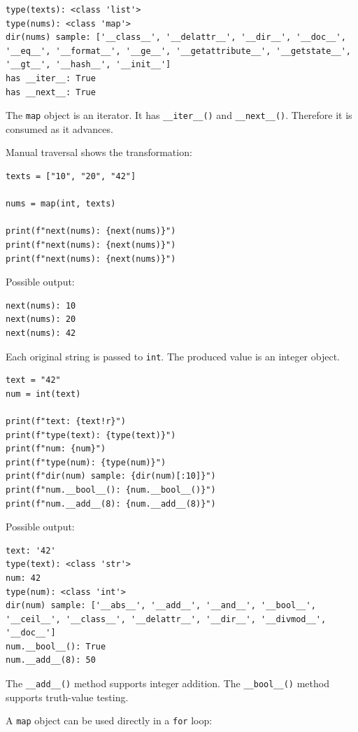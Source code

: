 \begin{verbatim}
type(texts): <class 'list'>
type(nums): <class 'map'>
dir(nums) sample: ['__class__', '__delattr__', '__dir__', '__doc__',
'__eq__', '__format__', '__ge__', '__getattribute__', '__getstate__',
'__gt__', '__hash__', '__init__']
has __iter__: True
has __next__: True
\end{verbatim}

The \texttt{map} object is an iterator. It has \texttt{\_\_iter\_\_()} and \texttt{\_\_next\_\_()}. Therefore it is consumed as it advances.

Manual traversal shows the transformation:

\begin{verbatim}
texts = ["10", "20", "42"]

nums = map(int, texts)

print(f"next(nums): {next(nums)}")
print(f"next(nums): {next(nums)}")
print(f"next(nums): {next(nums)}")
\end{verbatim}

Possible output:

\begin{verbatim}
next(nums): 10
next(nums): 20
next(nums): 42
\end{verbatim}

Each original string is passed to \texttt{int}. The produced value is an integer object.

\begin{verbatim}
text = "42"
num = int(text)

print(f"text: {text!r}")
print(f"type(text): {type(text)}")
print(f"num: {num}")
print(f"type(num): {type(num)}")
print(f"dir(num) sample: {dir(num)[:10]}")
print(f"num.__bool__(): {num.__bool__()}")
print(f"num.__add__(8): {num.__add__(8)}")
\end{verbatim}

Possible output:

\begin{verbatim}
text: '42'
type(text): <class 'str'>
num: 42
type(num): <class 'int'>
dir(num) sample: ['__abs__', '__add__', '__and__', '__bool__',
'__ceil__', '__class__', '__delattr__', '__dir__', '__divmod__',
'__doc__']
num.__bool__(): True
num.__add__(8): 50
\end{verbatim}

The \texttt{\_\_add\_\_()} method supports integer addition. The \texttt{\_\_bool\_\_()} method supports truth-value testing.

A \texttt{map} object can be used directly in a \texttt{for} loop:

